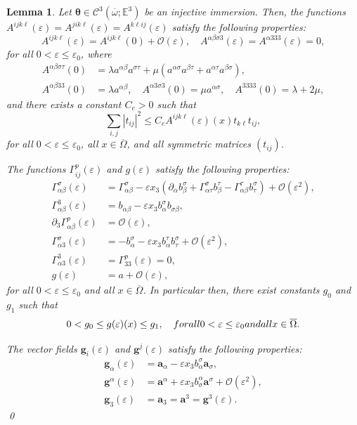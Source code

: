 \documentclass{amsart}
\newtheorem{lemma}{Lemma}[section]
\begin{document}
\begin{lemma} \label{lem:2}
Let $\bm{\theta} \in \mathcal{C}^3(\overline{\omega};\mathbb{E}^3)$ be an injective immersion.
Then, the functions $A^{ijk\ell}(\varepsilon) = A^{jik\ell}(\varepsilon) = A^{k\ell ij}(\varepsilon)$ satisfy the following properties:
$$
A^{ijk\ell}(\varepsilon)=A^{ijk\ell}(0)+\mathcal{O}(\varepsilon) , \quad A^{\alpha\beta\sigma3}(\varepsilon)=A^{\alpha333}(\varepsilon)=0,
$$
for all $0<\varepsilon\le\varepsilon_0$, where
\begin{align*}
A^{\alpha\beta\sigma\tau}(0)&=\lambda a^{\alpha\beta}a^{\sigma\tau}+\mu(a^{\alpha\sigma}a^{\beta\tau}+a^{\alpha\tau}a^{\beta\sigma}),\\
A^{\alpha\beta 33} (0) &= \lambda a^{\alpha\beta}, \quad A^{\alpha 3\sigma 3}(0)=\mu a^{\alpha\sigma}, \quad A^{3333}(0)=\lambda+2\mu,
\end{align*}
and there exists a constant $C_e > 0$ such that
$$
\sum_{i,j}|t_{ij}|^2\le C_e A^{ijk\ell}(\varepsilon)(x) t_{k\ell} t_{ij},
$$
for all $0<\varepsilon\le\varepsilon_0$, all $x \in \overline{\Omega}$, and all symmetric matrices $(t_{ij})$.

The functions $\Gamma^p_{ij} (\varepsilon)$ and $g(\varepsilon)$ satisfy the following properties:
\begin{align*}
\Gamma^\sigma_{\alpha\beta}(\varepsilon) &= \Gamma^\sigma_{\alpha\beta} - \varepsilon x_3 (\partial_\alpha b^\sigma_\beta + \Gamma^\sigma_{\alpha\tau} b^\tau_\beta - \Gamma^\tau_{\alpha\beta} b^\sigma_\tau) + \mathcal{O}(\varepsilon^2),\\
\Gamma^3_{\alpha\beta}(\varepsilon) &= b_{\alpha\beta} - \varepsilon x_3 b^\sigma_\alpha b_{\sigma \beta},\\
\partial_3 \Gamma^p_{\alpha\beta}(\varepsilon) &= \mathcal{O}(\varepsilon),\\
\Gamma^\sigma_{\alpha 3}(\varepsilon) &= - b^\sigma_\alpha - \varepsilon x_3 b^\tau_\alpha b^\sigma_\tau + \mathcal{O}(\varepsilon^2),\\
\Gamma^3_{\alpha 3}(\varepsilon) &= \Gamma^p_{33}(\varepsilon) =0,\\
g(\varepsilon) &= a + \mathcal{O}(\varepsilon),
\end{align*}
for all $0<\varepsilon \le \varepsilon_0$ and all $x \in \overline{\Omega}$. In particular then, there exist constants $g_0$ and $g_1$ such that
$$
0 < g_0 \le g(\varepsilon)(x) \le g_1,\quad \textup{ for all }0<\varepsilon \le \varepsilon_0 \textup{ and all }x \in \overline{\Omega}.
$$

The vector fields $\bm{g}_i (\varepsilon)$ and $\bm{g}^j(\varepsilon)$ satisfy the following properties:
\begin{align*}
\bm{g}_\alpha(\varepsilon) &= \bm{a}_\alpha - \varepsilon x_3 b^\sigma_\alpha \bm{a}_\sigma,\\
\bm{g}^\alpha(\varepsilon) &= \bm{a}^\alpha + \varepsilon x_3 b^\alpha_\sigma \bm{a}^\sigma + \mathcal{O}(\varepsilon^2),\\
\bm{g}_3(\varepsilon)&=\bm{a}_3=\bm{a}^3=\bm{g}^3(\varepsilon).
\end{align*}
\qed
\end{lemma}
\end{document}
